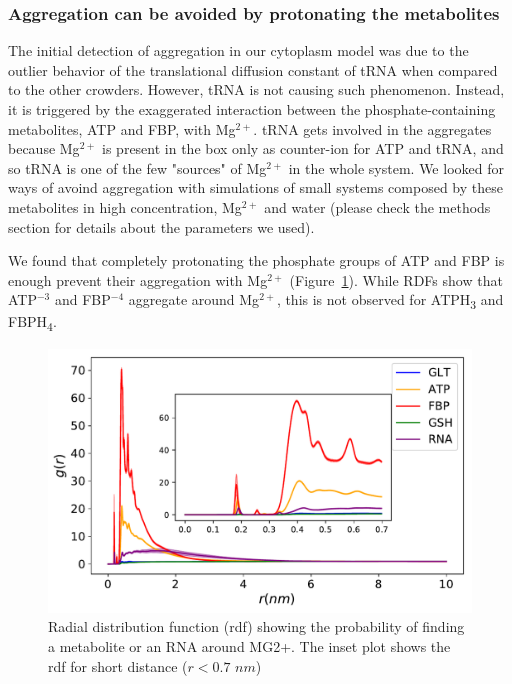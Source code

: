 \documentclass[journal=jacsat,manuscript=article]{achemso}
\begin{document}

\subsubsection{Aggregation can be avoided by protonating the metabolites}

The initial detection of aggregation in our cytoplasm model was due to the outlier behavior of the translational diffusion constant of tRNA when compared to the other crowders. However, tRNA is not causing such phenomenon. Instead, it is triggered by the exaggerated interaction between the phosphate-containing metabolites, ATP and FBP, with Mg$^{2+}$. tRNA gets involved in the aggregates because Mg$^{2+}$ is present in the box only as counter-ion for ATP and tRNA, and so tRNA is one of the few "sources" of Mg$^{2+}$ in the whole system. We looked for ways of avoind aggregation with simulations of small systems composed by these metabolites in high concentration, Mg$^{2+}$ and water (please check the methods section for details about the parameters we used).

We found that completely protonating the phosphate groups of ATP and FBP is enough prevent their aggregation with Mg$^{2+}$ (Figure~\ref{fig:avoiding_aggregation}). While RDFs show that ATP$^{-3}$ and FBP$^{-4}$ aggregate around Mg$^{2+}$, this is not observed for ATPH\textsubscript{3} and FBPH\textsubscript{4}.

\begin{figure}[H]
\includegraphics[scale=0.5]{rdf_mg.pdf}
\caption{Radial distribution function (rdf) showing the probability of finding a metabolite or an RNA around MG2+. The inset plot shows the rdf for short distance ($ r < 0.7 \,\, nm$)}
\label{fig:avoiding_aggregation}
\end{figure}
\end{document}
